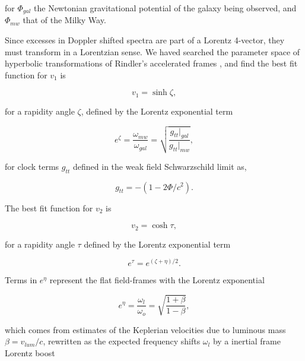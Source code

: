 \documentclass[reprint,%
 amsmath,amssymb,
 aps,
]{revtex4-1}
\begin{document}
 for $\Phi_{gal}$ the    Newtonian gravitational potential of the galaxy being observed, and $\Phi_{mw}$ that of  the Milky Way.  
 
 
 Since    excesses in Doppler shifted spectra
  are     part of  a Lorentz 4-vector, they    must transform in a Lorentzian sense. We haved searched the parameter space of hyperbolic transformations of Rindler's  accelerated  frames \cite{Cisneros:2013vha,Cisneros:2014fea,Cisneros2015,Cisn2016}, and find the best fit function for $v_1$  is

 
 
   \begin{equation}
       v_1 = \sinh \zeta, 
       \label{eq:hyperbolica}
   \end{equation}
 
 for a rapidity angle $\zeta$,  defined by the    Lorentz exponential  term  
  
   
     \begin{equation}
     e^{\zeta}=  \frac{\omega_{mw}}{\omega_{gal}}  =\sqrt{\frac{g_{tt}|_{gal}}{g_{tt}|_{mw}}},
      \label{eq:gravRS}
    \end{equation}
    
 for  clock terms $g_{tt}$   defined in the   weak field Schwarzschild limit  \cite{Hartle} as, 
 
  \begin{equation}
      g_{tt}= -( 1 - 2\Phi/ c^2).
      \label{clocktime}
  \end{equation} 
  

The best fit function for  $v_2$ is 

\begin{equation}
v_{2} =  \cosh \tau, 
\label{eq:hyperbolico}
\end{equation}


 
 
  for a rapidity angle $\tau$ defined by the    Lorentz exponential  term  
  
 
\begin{equation}
    e^{\tau}=   e^{(\zeta+\eta)/2}.
\end{equation}
 
Terms in $e^\eta$ represent the  flat field-frames with the
Lorentz exponential  

\begin{equation}
    e^{\eta}=\frac{\omega_{l}}{\omega_o}= \sqrt{\frac{1+\beta}{1-\beta}},
    \label{eq:flat}
\end{equation}  
     
which comes from estimates of the Keplerian velocities due to luminous mass
$\beta = v_{lum}/c$, rewritten as the expected      frequency shifts $\omega_{l}$      by a inertial frame Lorentz boost   
\end{document}
